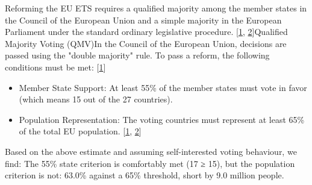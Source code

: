 Reforming the EU ETS requires a qualified majority among the member states in the Council of the European Union and a simple majority in the European Parliament under the standard ordinary legislative procedure. [\href{https://eur-lex.europa.eu/EN/legal-content/glossary/simple-majority.html}{1}, \href{https://www.riksdagen.se/en/how-the-riksdag-works/how-the-eu-works/how-an-eu-law-is-made/}{2}]Qualified Majority Voting (QMV)In the Council of the European Union, decisions are passed using the "double majority" rule. To pass a reform, the following conditions must be met: [\href{https://www.consilium.europa.eu/en/council-eu/how-does-the-council-vote/qualified-majority/}{1}]

\begin{itemize}
        \item Member State Support: At least 55\% of the member states must vote in favor (which means 15 out of the 27 countries).
        \item Population Representation: The voting countries must represent at least 65\% of the total EU population. [\href{https://infogm.org/en/eu-council-approves-deregulation-of-gmos-ntgs/}{1}, \href{https://news.err.ee/1609642526/estonia-to-look-for-allies-in-fight-against-ets2}{2}]
\end{itemize}

Based on the above estimate and assuming self-interested voting behaviour, we find: The 55\% state criterion is comfortably met (17 ≥ 15), but the population criterion is not: 63.0\% against a 65\% threshold, short by 9.0 million people. 

